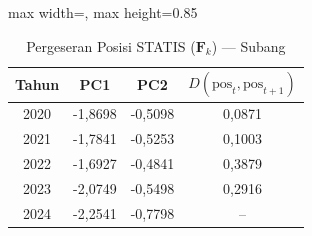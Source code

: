 \begin{table}[H]
\centering
\caption{Pergeseran Posisi STATIS ($\mathbf{F}_k$) --- Subang} \label{tab:app2jarak_statis_skor_subang}
\begin{adjustbox}{max width=\textwidth, max height=0.85\textheight}
\begin{tabular}{|c|c|c|c|}
\hline
\textbf{Tahun} & \textbf{PC1} & \textbf{PC2} & \textbf{$D(\text{pos}_t, \text{pos}_{t+1})$} \\
\hline
2020 & -1,8698 & -0,5098 & 0,0871 \\
2021 & -1,7841 & -0,5253 & 0,1003 \\
2022 & -1,6927 & -0,4841 & 0,3879 \\
2023 & -2,0749 & -0,5498 & 0,2916 \\
2024 & -2,2541 & -0,7798 & -- \\
\hline
\end{tabular}
\end{adjustbox}
\end{table}